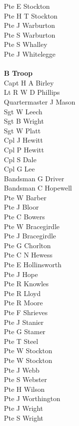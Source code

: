 \begin{multicols}{2}
  Pte E Stockton \\
  Pte H T Stockton \\
  Pte J Warburton \\
  Pte S Warburton \\
  Pte S Whalley \\
  Pte J Whitelegge \\
  \\
  \textbf{B Troop} \\
  Capt H A Birley \\
  Lt R W D Phillips \\
  Quartermaster J Mason \\
  Sgt W Leech \\
  Sgt B Wright \\
  Sgt W Platt \\
  Cpl J Hewitt \\
  Cpl P Hewitt \\
  Cpl S Dale \\
  Cpl G Lee \\
  Bandsman G Driver \\
  Bandsman C Hopewell \\
  Pte W Barber \\
  Pte J Bloor \\
  Pte C Bowers \\
  Pte W Bracegirdle \\
  Pte J Bracegirdle \\
  Pte G Chorlton \\
  Pte C N Hewess \\
  Pte E Hollinsworth \\
  Pte J Hope \\
  Pte R Knowles \\
  Pte R Lloyd \\
  Pte R Moore \\
  Pte F Shrieves \\
  Pte J Stanier \\
  Pte G Stamer \\
  Pte T Steel \\
  Pte W Stockton \\
  Pte W Stockton \\
  Pte J Webb \\
  Pte S Webster \\
  Pte H Wilson \\
  Pte J Worthington \\
  Pte J Wright \\
  Pte S Wright \\

\end{multicols}
